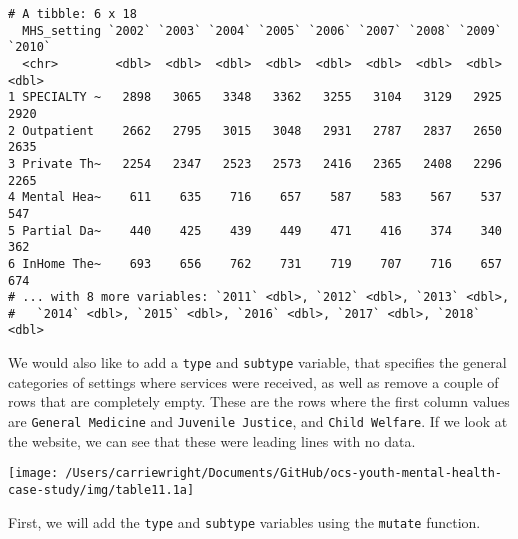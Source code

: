\documentclass[
]{article}
\newenvironment{Shaded}{\begin{snugshade}}{\end{snugshade}}
\newcommand{\DataTypeTok}[1]{\textcolor[rgb]{0.13,0.29,0.53}{#1}}
\newcommand{\FloatTok}[1]{\textcolor[rgb]{0.00,0.00,0.81}{#1}}
\newcommand{\KeywordTok}[1]{\textcolor[rgb]{0.13,0.29,0.53}{\textbf{#1}}}
\newcommand{\NormalTok}[1]{#1}
\newcommand{\OperatorTok}[1]{\textcolor[rgb]{0.81,0.36,0.00}{\textbf{#1}}}
\newcommand{\StringTok}[1]{\textcolor[rgb]{0.31,0.60,0.02}{#1}}
\begin{document}
\begin{Shaded}
\end{Shaded}

\begin{verbatim}
# A tibble: 6 x 18
  MHS_setting `2002` `2003` `2004` `2005` `2006` `2007` `2008` `2009` `2010`
  <chr>        <dbl>  <dbl>  <dbl>  <dbl>  <dbl>  <dbl>  <dbl>  <dbl>  <dbl>
1 SPECIALTY ~   2898   3065   3348   3362   3255   3104   3129   2925   2920
2 Outpatient    2662   2795   3015   3048   2931   2787   2837   2650   2635
3 Private Th~   2254   2347   2523   2573   2416   2365   2408   2296   2265
4 Mental Hea~    611    635    716    657    587    583    567    537    547
5 Partial Da~    440    425    439    449    471    416    374    340    362
6 InHome The~    693    656    762    731    719    707    716    657    674
# ... with 8 more variables: `2011` <dbl>, `2012` <dbl>, `2013` <dbl>,
#   `2014` <dbl>, `2015` <dbl>, `2016` <dbl>, `2017` <dbl>, `2018` <dbl>
\end{verbatim}

We would also like to add a \texttt{type} and \texttt{subtype} variable,
that specifies the general categories of settings where services were
received, as well as remove a couple of rows that are completely empty.
These are the rows where the first column values are
\texttt{General\ Medicine} and \texttt{Juvenile\ Justice}, and
\texttt{Child\ Welfare}. If we look at the website, we can see that
these were leading lines with no data.

\begin{center}\texttt{[image: /Users/carriewright/Documents/GitHub/ocs-youth-mental-health-case-study/img/table11.1a]} \end{center}

First, we will add the \texttt{type} and \texttt{subtype} variables
using the \texttt{mutate} function.
\end{document}
